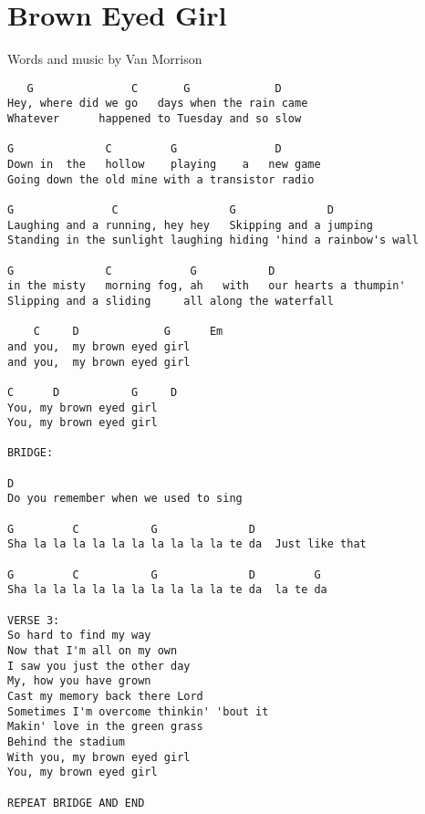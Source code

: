 \section{Brown Eyed Girl} \label{sec:song3}
Words and music by Van Morrison
\begin{verbatim}
   G               C       G             D  
Hey, where did we go   days when the rain came
Whatever      happened to Tuesday and so slow

G              C         G               D     
Down in  the   hollow    playing    a   new game 
Going down the old mine with a transistor radio

G               C                 G              D         
Laughing and a running, hey hey   Skipping and a jumping
Standing in the sunlight laughing hiding 'hind a rainbow's wall

G              C            G           D
in the misty   morning fog, ah   with   our hearts a thumpin'
Slipping and a sliding     all along the waterfall

    C     D             G      Em
and you,  my brown eyed girl 
and you,  my brown eyed girl 

C      D           G     D
You, my brown eyed girl
You, my brown eyed girl
  
BRIDGE:
 
D
Do you remember when we used to sing
 
G         C           G              D
Sha la la la la la la la la la la te da  Just like that
 
G         C           G              D         G
Sha la la la la la la la la la la te da  la te da
 
VERSE 3:
So hard to find my way 
Now that I'm all on my own
I saw you just the other day
My, how you have grown
Cast my memory back there Lord
Sometimes I'm overcome thinkin' 'bout it
Makin' love in the green grass
Behind the stadium
With you, my brown eyed girl
You, my brown eyed girl
 
REPEAT BRIDGE AND END
\end{verbatim}

